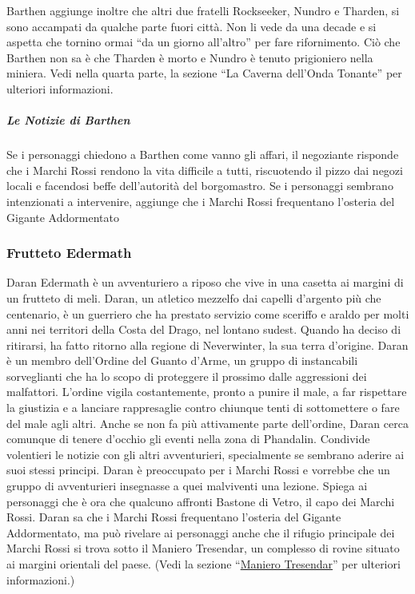 \documentclass{article}
\begin{document}
Barthen aggiunge inoltre che altri due fratelli Rockseeker,
Nundro e Tharden, si sono accampati da qualche parte fuori
città. Non li vede da una decade e si aspetta che tornino ormai
“da un giorno all’altro” per fare rifornimento. Ciò che Barthen
non sa è che Tharden è morto e Nundro è tenuto prigioniero
nella miniera. Vedi nella quarta parte, la sezione “La Caverna
dell’Onda Tonante” per ulteriori informazioni.
\subparagraph{Le Notizie di Barthen}
Se i personaggi chiedono a Barthen
come vanno gli affari, il negoziante risponde che i Marchi Rossi rendono la vita difficile a tutti, riscuotendo il pizzo dai
negozi locali e facendosi beffe dell'autorità del borgomastro. Se
i personaggi sembrano intenzionati a intervenire, aggiunge che
i Marchi Rossi frequentano l’osteria del Gigante Addormentato

\subsubsection{Frutteto Edermath}
\hypertarget{frutteto}{}
Daran Edermath è un avventuriero a riposo che vive in una
casetta ai margini di un frutteto di meli. Daran, un atletico
mezzelfo dai capelli d’argento più che centenario, è un
guerriero che ha prestato servizio come sceriffo e araldo per
molti anni nei territori della Costa del Drago, nel lontano
sudest. Quando ha deciso di ritirarsi, ha fatto ritorno alla
regione di Neverwinter, la sua terra d’origine.
Daran è un membro dell'Ordine del Guanto d’Arme,
un gruppo di instancabili sorveglianti che ha lo scopo di
proteggere il prossimo dalle aggressioni dei malfattori.
L'ordine vigila costantemente, pronto a punire il male, a
far rispettare la giustizia e a lanciare rappresaglie contro
chiunque tenti di sottomettere o fare del male agli altri. Anche
se non fa più attivamente parte dell'ordine, Daran cerca
comunque di tenere d'occhio gli eventi nella zona di Phandalin.
Condivide volentieri le notizie con gli altri avventurieri,
specialmente se sembrano aderire ai suoi stessi principi.
Daran è preoccupato per i Marchi Rossi e vorrebbe che
un gruppo di avventurieri insegnasse a quei malviventi una
lezione. Spiega ai personaggi che è ora che qualcuno affronti
Bastone di Vetro, il capo dei Marchi Rossi. Daran sa che i
Marchi Rossi frequentano l’osteria del Gigante Addormentato,
ma può rivelare ai personaggi anche che il rifugio principale
dei Marchi Rossi si trova sotto il Maniero Tresendar, un
complesso di rovine situato ai margini orientali del paese. (Vedi
la sezione “\hyperlink{maniero}{Maniero Tresendar}” per ulteriori informazioni.)
\end{document}
